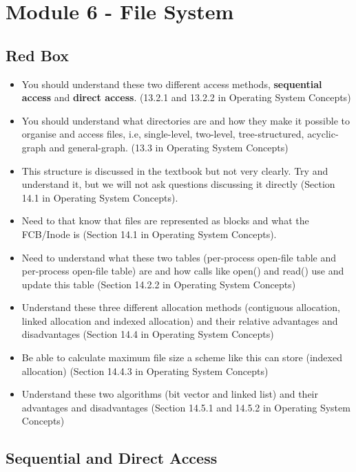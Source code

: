 \section{Module 6 - File System}
\subsection{Red Box}
\begin{itemize}
    \item You should understand these two different access methods, {\bf sequential access} and {\bf direct access}.  (13.2.1 and 13.2.2 in Operating System Concepts)
    \item You should understand what directories are and how they make it possible to organise and access files, i.e, single-level, two-level, tree-structured, acyclic-graph and general-graph. (13.3 in
    Operating System Concepts)
    \item This structure is discussed in the textbook but not very clearly. Try and understand it, but we will not ask
    questions discussing it directly (Section 14.1 in Operating System Concepts).
    \item Need to that know that files are represented as blocks and what the FCB/Inode is (Section 14.1 in Operating
    System Concepts).
    \item Need to understand what these two tables (per-process open-file table and per-process open-file table) are and how calls like open() and read() use and update this table
    (Section 14.2.2 in Operating System Concepts)
    \item Understand these three different allocation methods (contiguous allocation, linked allocation and indexed allocation) and their relative advantages and disadvantages (Section
    14.4 in Operating System Concepts)
    \item Be able to calculate maximum file size a scheme like this can store (indexed allocation) (Section 14.4.3 in Operating System Concepts)
    \item Understand these two algorithms (bit vector and linked list) and their advantages and disadvantages (Section 14.5.1 and 14.5.2 in
    Operating System Concepts)
\end{itemize}



\subsection{Sequential and Direct Access}

